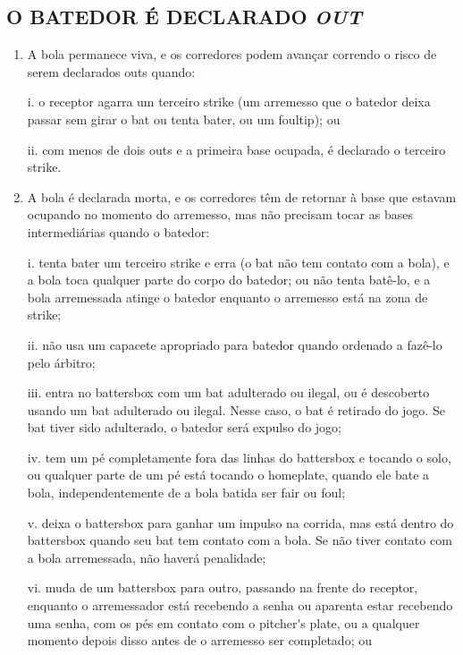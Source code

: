 \subsection{O BATEDOR É DECLARADO \textit{OUT}}
\begin{enumerate}[label=(\alph*)]
	\item   A bola permanece viva, e os corredores podem avançar correndo o risco de serem declarados \gls{out}s quando:

	 i. o receptor agarra um terceiro \gls{strike} (um arremesso que o batedor deixa passar sem girar o \gls{bat} ou tenta bater, ou um \gls{foultip}); ou

	 ii. com menos de dois \glspl{out} e a primeira base ocupada, é declarado o terceiro \gls{strike}.

\item  A bola é declarada morta, e os corredores têm de retornar à base que estavam ocupando no momento do arremesso, mas não precisam tocar as bases intermediárias quando o batedor:

 i. tenta bater um terceiro \gls{strike} e erra (o \gls{bat} não tem contato com a bola), e a bola toca qualquer parte do corpo do batedor; ou não tenta batê-lo, e a bola arremessada atinge o batedor enquanto o arremesso está na zona de \gls{strike};

 ii. não usa um capacete apropriado para batedor quando ordenado a fazê-lo pelo árbitro;

 iii. entra no \gls{battersbox} com um \gls{bat} adulterado ou ilegal, ou é descoberto usando um \gls{bat} adulterado ou ilegal. Nesse caso, o \gls{bat} é retirado do jogo. Se \gls{bat} tiver sido adulterado, o batedor será expulso do jogo;

 iv. tem um pé completamente fora das linhas do \gls{battersbox} e tocando o solo, ou qualquer parte de um pé está tocando o \gls{homeplate}, quando ele bate a bola, independentemente de a bola batida ser \gls{fair} ou \gls{foul};

 v. deixa o \gls{battersbox} para ganhar um impulso na corrida, mas está dentro do \gls{battersbox} quando seu \gls{bat} tem contato com a bola. Se não tiver contato com a bola arremessada, não haverá penalidade;

 vi. muda de um \gls{battersbox} para outro, passando na frente do receptor, enquanto o arremessador está recebendo a senha ou aparenta estar recebendo uma senha, com os pés em contato com o \gls{pitcher's plate}, ou a qualquer momento depois disso antes de o arremesso ser completado; ou


\end{enumerate}
